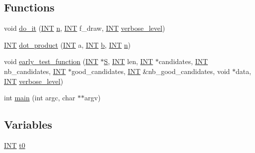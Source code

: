 \subsection*{Functions}
\begin{DoxyCompactItemize}
\item 
void \mbox{\hyperlink{hadamard_8_c_a43e760f00f7306dff572dae5a6135e5a}{do\+\_\+it}} (\mbox{\hyperlink{galois_8h_a09fddde158a3a20bd2dcadb609de11dc}{I\+NT}} \mbox{\hyperlink{simeon_8_c_a7f2cd26777ce0ff3fdaf8d02aacbddfb}{n}}, \mbox{\hyperlink{galois_8h_a09fddde158a3a20bd2dcadb609de11dc}{I\+NT}} f\+\_\+draw, \mbox{\hyperlink{galois_8h_a09fddde158a3a20bd2dcadb609de11dc}{I\+NT}} \mbox{\hyperlink{simeon_8_c_a818073fbcc2f439e7c56952f67386122}{verbose\+\_\+level}})
\item 
\mbox{\hyperlink{galois_8h_a09fddde158a3a20bd2dcadb609de11dc}{I\+NT}} \mbox{\hyperlink{hadamard_8_c_accd41df23175cf150ef5666933d6ce8e}{dot\+\_\+product}} (\mbox{\hyperlink{galois_8h_a09fddde158a3a20bd2dcadb609de11dc}{I\+NT}} a, \mbox{\hyperlink{galois_8h_a09fddde158a3a20bd2dcadb609de11dc}{I\+NT}} \mbox{\hyperlink{alphabet2_8_c_a148e3876077787926724625411d6e7a9}{b}}, \mbox{\hyperlink{galois_8h_a09fddde158a3a20bd2dcadb609de11dc}{I\+NT}} \mbox{\hyperlink{simeon_8_c_a7f2cd26777ce0ff3fdaf8d02aacbddfb}{n}})
\item 
void \mbox{\hyperlink{hadamard_8_c_a31cd862d97914e4206b42d1c9a898353}{early\+\_\+test\+\_\+function}} (\mbox{\hyperlink{galois_8h_a09fddde158a3a20bd2dcadb609de11dc}{I\+NT}} $\ast$\mbox{\hyperlink{simeon_8_c_adab47f8243f1b5a2c31df2535d6b37d0}{S}}, \mbox{\hyperlink{galois_8h_a09fddde158a3a20bd2dcadb609de11dc}{I\+NT}} len, \mbox{\hyperlink{galois_8h_a09fddde158a3a20bd2dcadb609de11dc}{I\+NT}} $\ast$candidates, \mbox{\hyperlink{galois_8h_a09fddde158a3a20bd2dcadb609de11dc}{I\+NT}} nb\+\_\+candidates, \mbox{\hyperlink{galois_8h_a09fddde158a3a20bd2dcadb609de11dc}{I\+NT}} $\ast$good\+\_\+candidates, \mbox{\hyperlink{galois_8h_a09fddde158a3a20bd2dcadb609de11dc}{I\+NT}} \&nb\+\_\+good\+\_\+candidates, void $\ast$data, \mbox{\hyperlink{galois_8h_a09fddde158a3a20bd2dcadb609de11dc}{I\+NT}} \mbox{\hyperlink{simeon_8_c_a818073fbcc2f439e7c56952f67386122}{verbose\+\_\+level}})
\item 
int \mbox{\hyperlink{hadamard_8_c_a3c04138a5bfe5d72780bb7e82a18e627}{main}} (int argc, char $\ast$$\ast$argv)
\end{DoxyCompactItemize}
\subsection*{Variables}
\begin{DoxyCompactItemize}
\item 
\mbox{\hyperlink{galois_8h_a09fddde158a3a20bd2dcadb609de11dc}{I\+NT}} \mbox{\hyperlink{hadamard_8_c_a4268f4fe222ffb119218a0199f5e1904}{t0}}
\end{DoxyCompactItemize}



